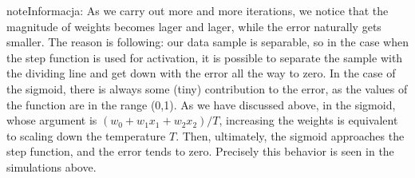 \documentclass[a4paper,12pt,polish]{jupyterBook}
\begin{document}
\begin{sphinxVerbatimInput}
\begin{sphinxVerbatim}[commandchars=\\\{\}]
 
 
 

   

\end{sphinxVerbatim}
\end{sphinxVerbatimInput}
\begin{sphinxVerbatimOutput}

\noindent{}
\end{sphinxVerbatimOutput}

\begin{sphinxadmonition}{note}{Informacja:}
\sphinxAtStartPar
As we carry out more and more iterations, we notice that the magnitude of weights becomes lager and lager, while the error naturally gets smaller. The reason is following: our data sample is separable, so in the case when the step function is used for activation, it is possible to separate the sample with the dividing line and get down with the error all the way to zero. In the case of the sigmoid, there is always some (tiny) contribution to the error, as the values of the function are in the range (0,1). As we have discussed above, in the sigmoid, whose argument is \( (w_0 + w_1 x_1 + w_2 x_2) / T\), increasing the weights is equivalent to scaling down the temperature \(T\). Then, ultimately, the sigmoid approaches the step function, and the error tends to zero. Precisely this behavior is seen in the simulations above.
\end{sphinxadmonition}
\end{document}
